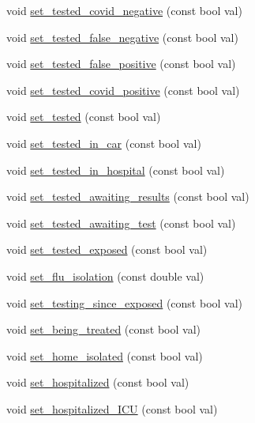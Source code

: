 \begin{DoxyCompactItemize}
\item 
void \hyperlink{classAgent_ab088831cd1e785e50aa2c6b49aac4b5f}{set\+\_\+tested\+\_\+covid\+\_\+negative} (const bool val)
\item 
void \hyperlink{classAgent_a50c49aa75d352945304c113a61c228c2}{set\+\_\+tested\+\_\+false\+\_\+negative} (const bool val)
\item 
void \hyperlink{classAgent_ad9b9ec740dbfec968b96cffc107429b6}{set\+\_\+tested\+\_\+false\+\_\+positive} (const bool val)
\item 
void \hyperlink{classAgent_a91e1958e695d18c520eb31180c89f303}{set\+\_\+tested\+\_\+covid\+\_\+positive} (const bool val)
\item 
void \hyperlink{classAgent_a4d7e1d046358653bf124fa4ca706de14}{set\+\_\+tested} (const bool val)
\item 
void \hyperlink{classAgent_ab77dec7b7506794e477113c27205d3ad}{set\+\_\+tested\+\_\+in\+\_\+car} (const bool val)
\item 
void \hyperlink{classAgent_a43eadb387fe119bbcb27b6a675179e43}{set\+\_\+tested\+\_\+in\+\_\+hospital} (const bool val)
\item 
void \hyperlink{classAgent_a1501d820a1f28294bbbaf20521775de3}{set\+\_\+tested\+\_\+awaiting\+\_\+results} (const bool val)
\item 
void \hyperlink{classAgent_a42e2c36cb50cb083d41133aad2cccff3}{set\+\_\+tested\+\_\+awaiting\+\_\+test} (const bool val)
\item 
void \hyperlink{classAgent_abda603a36472845e7aca1d584e6040a4}{set\+\_\+tested\+\_\+exposed} (const bool val)
\item 
void \hyperlink{classAgent_ae66fd7d3371a11c2bb235cf761ceac26}{set\+\_\+flu\+\_\+isolation} (const double val)
\item 
void \hyperlink{classAgent_a72d9ede5c5d13bf0b7c78358c88c5229}{set\+\_\+testing\+\_\+since\+\_\+exposed} (const bool val)
\item 
void \hyperlink{classAgent_a93847d02492d357ceb787aee6cfd0494}{set\+\_\+being\+\_\+treated} (const bool val)
\item 
void \hyperlink{classAgent_aee2da7db024cf43595e53431bd997b7b}{set\+\_\+home\+\_\+isolated} (const bool val)
\item 
void \hyperlink{classAgent_a6fadc5ac579265c35a344a7b718fff71}{set\+\_\+hospitalized} (const bool val)
\item 
void \hyperlink{classAgent_ad5f4b7735883e1145f95ebac41a6ff0c}{set\+\_\+hospitalized\+\_\+\+I\+CU} (const bool val)
\item 

\end{DoxyCompactItemize}

